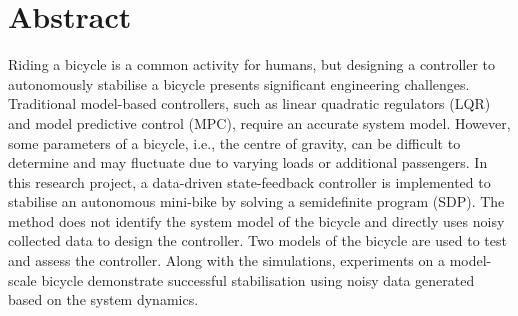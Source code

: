 \chapter*{Abstract}
Riding a bicycle is a common activity for humans, but designing a controller to autonomously stabilise a bicycle presents significant engineering challenges.
Traditional model-based controllers, such as linear quadratic regulators (LQR) and model predictive control (MPC), require an accurate system model.
However, some parameters of a bicycle, i.e., the centre of gravity, can be difficult to determine and may fluctuate due to varying loads or additional passengers.
In this research project, a data-driven state-feedback controller is implemented to stabilise an autonomous mini-bike by solving a semidefinite program (SDP).
The method does not identify the system model of the bicycle and directly uses noisy collected data to design the controller.
Two models of the bicycle are used to test and assess the controller.
Along with the simulations, experiments on a model-scale bicycle demonstrate successful stabilisation using noisy data generated based on the system dynamics.